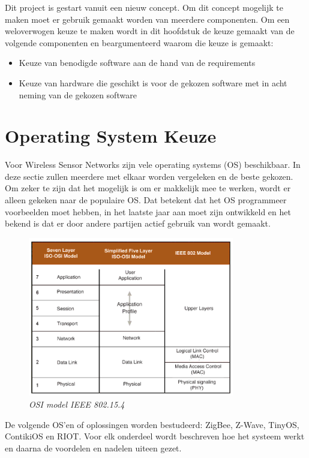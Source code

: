 \documentclass{../local}
\begin{document}
Dit project is gestart vanuit een nieuw concept. Om dit concept mogelijk te maken moet er gebruik gemaakt worden van meerdere componenten. Om een weloverwogen keuze te maken wordt in dit hoofdstuk de keuze gemaakt van de volgende componenten en beargumenteerd waarom die keuze is gemaakt:
\begin{itemize}
\item Keuze van benodigde software aan de hand van de requirements
\item Keuze van hardware die geschikt is voor de gekozen software met in acht neming van de gekozen software

\end{itemize}

\section{Operating System Keuze}
Voor Wireless Sensor Networks zijn vele operating systems (OS) beschikbaar. In deze sectie zullen meerdere met elkaar worden vergeleken en de beste gekozen. Om zeker te zijn dat het mogelijk is om er makkelijk mee te werken, wordt er alleen gekeken naar de populaire OS. Dat betekent dat het OS programmeer voorbeelden moet hebben, in het laatste jaar aan moet zijn ontwikkeld en het bekend is dat er door andere partijen actief gebruik van wordt gemaakt.

\begin{figure}
	\vspace{-20pt}
	\includegraphics[width=9cm]{../images/OSI-IEE802}
	\caption{\emph{OSI model IEEE 802.15.4 \cite{gutierrez2004low}}} \label{fig:OSIIEEE}

\end{figure}

De volgende OS'en of oplossingen worden bestudeerd: ZigBee, Z-Wave, TinyOS, ContikiOS en RIOT. Voor elk onderdeel wordt beschreven hoe het systeem werkt en daarna de voordelen en nadelen uiteen gezet.
\end{document}
